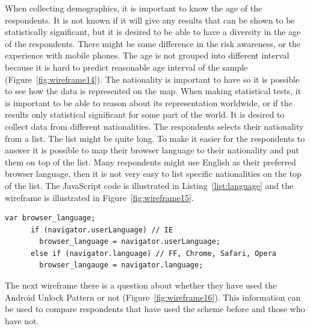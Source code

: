     When collecting demographics, it is important to know the age of the respondents. It is not known if it will give any results that can be shown to be statistically significant, but it is desired to be able to have a diversity in the age of the respondents. There might be some difference in the risk awareness, or the experience with mobile phones. The age is not grouped into different interval because it is hard to predict reasonable age interval of the sample (Figure~\ref{fig:wireframe14}). The nationality is important to have so it is possible to see how the data is represented on the map. When making statistical tests, it is important to be able to reason about its representation worldwide, or if the results only statistical significant for some part of the world. It is desired to collect data from different nationalities. The respondents selects their nationality from a list. The list might be quite long. To make it easier for the respondents to answer it is possible to map their browser language to their nationality and put them on top of the list. Many respondents might use English as their preferred browser language, then it is not very easy to list specific nationalities on the top of the list. The JavaScript code is illustrated in Listing~\ref{list:language} and the wireframe is illustrated in Figure~\ref{fig:wireframe15}. 

    \medskip
    \begin{lstlisting}[caption=Detecting browser language, label=list:language]
      var browser_language;
      if (navigator.userLanguage) // IE
        browser_language = navigator.userLanguage;
      else if (navigator.language) // FF, Chrome, Safari, Opera
        browser_langauge = navigator.language;
    \end{lstlisting}

    The next wireframe there is a question about whether they have used the Android Unlock Pattern or not (Figure~\ref{fig:wireframe16}). This information can be used to compare respondents that have used the scheme before and those who have not. 

